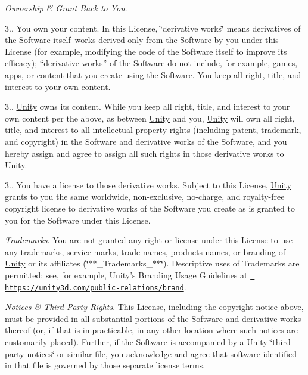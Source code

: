 \begin{DoxyEnumerate}
\item {\itshape Ownership \& Grant Back to You}.

3.. You own your content. In this License, \char`\"{}derivative works\char`\"{} means derivatives of the Software itself--works derived only from the Software by you under this License (for example, modifying the code of the Software itself to improve its efficacy); “derivative works” of the Software do not include, for example, games, apps, or content that you create using the Software. You keep all right, title, and interest to your own content.

3.. \mbox{\hyperlink{namespace_unity}{Unity}} owns its content. While you keep all right, title, and interest to your own content per the above, as between \mbox{\hyperlink{namespace_unity}{Unity}} and you, \mbox{\hyperlink{namespace_unity}{Unity}} will own all right, title, and interest to all intellectual property rights (including patent, trademark, and copyright) in the Software and derivative works of the Software, and you hereby assign and agree to assign all such rights in those derivative works to \mbox{\hyperlink{namespace_unity}{Unity}}.

3.. You have a license to those derivative works. Subject to this License, \mbox{\hyperlink{namespace_unity}{Unity}} grants to you the same worldwide, non-\/exclusive, no-\/charge, and royalty-\/free copyright license to derivative works of the Software you create as is granted to you for the Software under this License.
\end{DoxyEnumerate}
\begin{DoxyEnumerate}
\item {\itshape Trademarks}. You are not granted any right or license under this License to use any trademarks, service marks, trade names, products names, or branding of \mbox{\hyperlink{namespace_unity}{Unity}} or its affiliates (\char`\"{}$\ast$$\ast$\+\_\+\+Trademarks\+\_\+$\ast$$\ast$\char`\"{}). Descriptive uses of Trademarks are permitted; see, for example, Unity’s Branding Usage Guidelines at \href{https://unity3d.com/public-relations/brand}{\texttt{ https\+://unity3d.\+com/public-\/relations/brand}}.
\end{DoxyEnumerate}
\begin{DoxyEnumerate}
\item {\itshape Notices \& Third-\/\+Party Rights}. This License, including the copyright notice above, must be provided in all substantial portions of the Software and derivative works thereof (or, if that is impracticable, in any other location where such notices are customarily placed). Further, if the Software is accompanied by a \mbox{\hyperlink{namespace_unity}{Unity}} \char`\"{}third-\/party notices\char`\"{} or similar file, you acknowledge and agree that software identified in that file is governed by those separate license terms.
\end{DoxyEnumerate}
